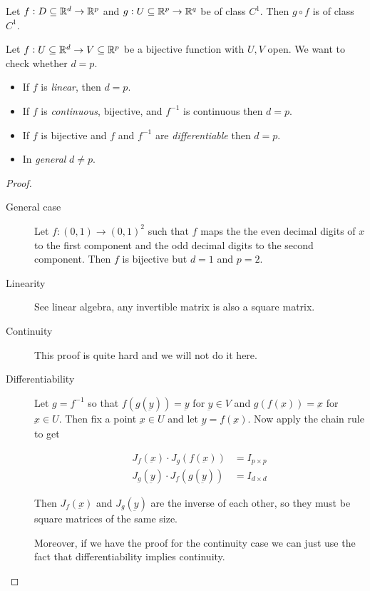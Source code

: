 \documentclass[12pt]{report}
\renewcommand{\vec}[1]{\underbar{\ensuremath{#1}}}
\begin{document}
\begin{proposition}
    Let $f: D \subseteq \mathbb{R}^d \to \mathbb{R}^p$ and $g: U \subseteq \mathbb{R}^p \to \mathbb{R}^q$ be of class $C^1$.
    Then $g \circ f$ is of class $C^1$.
\end{proposition}

\begin{proposition}
    Let $f: U \subseteq \mathbb{R}^d \to V \subseteq \mathbb{R}^p$ be a bijective function with $U, V$ open. We want to check whether $d = p$.

    \begin{itemize}
        \item If $f$ is \emph{linear}, then $d = p$.
        \item If $f$ is \emph{continuous}, bijective, and $f^{-1}$ is continuous then $d = p$.
        \item If $f$ is bijective and $f$ and $f^{-1}$ are \emph{differentiable} then $d = p$.
        \item In \emph{general} $d \neq p$.
    \end{itemize}
\end{proposition}

\begin{proof}
    \skiplineafterproof
    \begin{description}
        \item[General case]
            Let $f : (0,1) \to (0,1)^2$ such that $f$ maps the the even decimal digits of $x$ to the first component and the odd decimal digits to the second component.
            Then $f$ is bijective but $d = 1$ and $p = 2$.

        \item[Linearity]
            See linear algebra, any invertible matrix is also a square matrix.

        \item[Continuity]
            This proof is quite hard and we will not do it here.

        \item[Differentiability]
            Let $g = f^{-1}$ so that $f(g(\vec{y})) = \vec{y}$ for $\vec{y} \in V$ and $g(f(\vec{x})) = \vec{x}$ for $\vec{x} \in U$.
            Then fix a point $\vec{x} \in U$ and let $\vec{y} = f(\vec{x})$.
            Now apply the chain rule to get

            \begin{align*}
                J_f(\vec{x}) \cdot J_g(f(\vec{x})) & = I_{p\times p} \\
                J_g(\vec{y}) \cdot J_f(g(\vec{y})) & = I_{d\times d}
            \end{align*}

            Then $J_f(\vec{x})$ and $J_g(\vec{y})$ are the inverse of each other, so they must be square matrices of the same size.

            Moreover, if we have the proof for the continuity case we can just use the fact that differentiability implies continuity.
    \end{description}
\end{proof}
\end{document}
